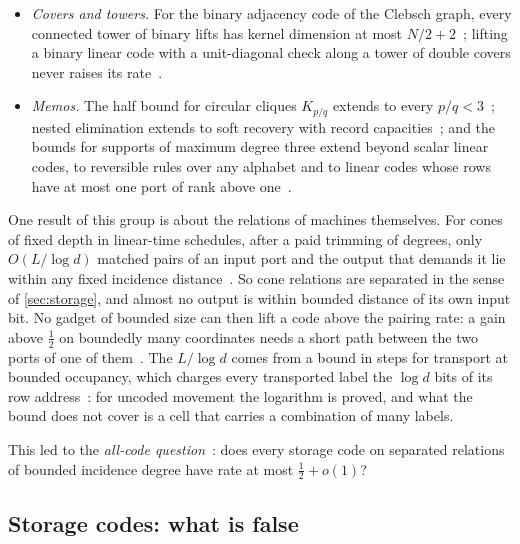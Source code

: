\begin{itemize}[leftmargin=1.5em]
$\card C^2=4^{14}$~\cite[Example~7.8]{SeventhPaper2026}.
\item \emph{Covers and towers.} For the binary adjacency code of the Clebsch graph, every connected tower of binary
lifts has kernel dimension at most $N/2+2$~\cite[Theorem~9.2]{Covers2026}; lifting a binary linear code with a
unit-diagonal check along a tower of double covers never raises its rate~\cite[Theorem~8.1]{EighthPaper2026}.
\item \emph{Memos.} The half bound for circular cliques $K_{p/q}$ extends to every $p/q<3$~\cite{CircularMemo2026};
nested elimination extends to soft recovery with record capacities~\cite{SoftRecovery2026}; and the bounds for supports
of maximum degree three extend beyond scalar linear codes, to reversible rules over any alphabet and to linear codes
whose rows have at most one port of rank above one~\cite{SubcubicMemo2026}.
\end{itemize}

One result of this group is about the relations of machines themselves. For cones of fixed depth in linear-time
schedules, after a paid trimming of degrees, only $O(L/\log d)$ matched pairs of an input port and the output that
demands it lie within any fixed incidence
distance~\cite[Theorem~3.3, Corollaries~3.7 and~3.8]{DirectedRecovery2026}. So cone relations are separated in the
sense of \cref{sec:storage}, and almost no output is within bounded distance of its own input bit. No gadget of bounded
size can then lift a code above the pairing rate: a gain above $\tfrac12$ on boundedly many coordinates needs a short
path between the two ports of one of them~\cite[Lemma~4.1 and Theorem~4.2]{DirectedRecovery2026}. The $L/\log d$ comes
from a bound in steps for transport at bounded occupancy, which charges every transported label the $\log d$ bits of
its row address~\cite[Lemma~3.4]{DirectedRecovery2026}: for uncoded movement the logarithm is proved, and what the
bound does not cover is a cell that carries a combination of many labels.

This led to the \emph{all-code question}~\cite[Question~9.1]{DirectedRecovery2026}: does every storage code on
separated relations of bounded incidence degree have rate at most $\tfrac12+o(1)$?

\subsection{Storage codes: what is false}\label{sec:false}

